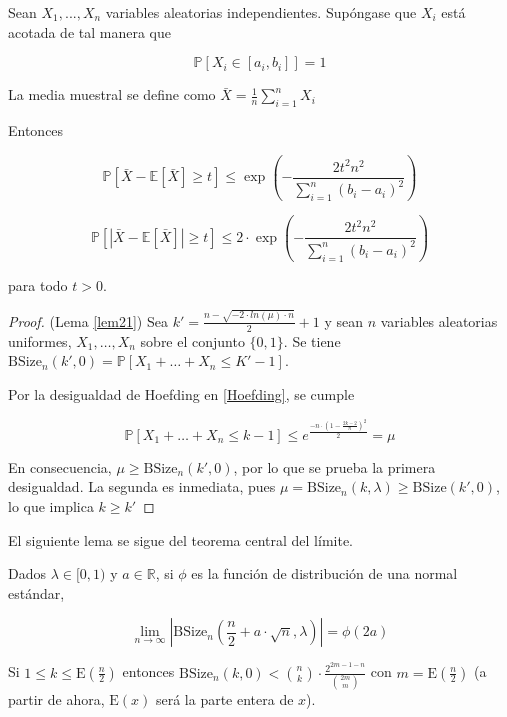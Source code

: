\begin{lema} \label{Hoefding}
Sean $X_1,...,X_n$ variables aleatorias independientes. Supóngase que $X_i$ está acotada de tal manera que 

$$\mathbb{P}[X_i \in [a_i,b_i]] = 1$$

La media muestral se define como $\bar{X} = \frac{1}{n} \sum_{i=1}^n X_i$

Entonces

\begin{equation}
\mathbb{P}[\bar{X} - \mathbb{E}[\bar{X}] \geq t] \leq \exp \left( - \frac{2t^2n^2}{\sum_{i=1}^n (b_i-a_i)^2} \right)
\end{equation}

\begin{equation}
\mathbb{P}[|\bar{X}-\mathbb{E}[\bar{X}]| \geq t] \leq 2 \cdot \exp \left( - \frac{2t^2n^2}{\sum_{i=1}^n (b_i - a_i)^2} \right)
\end{equation}

para todo $t > 0$.

\end{lema}

\begin{proof}(Lema \ref{lem21})
Sea $k' = \frac{n-\sqrt{-2 \cdot ln(\mu)\cdot n}}{2}+1$ y sean $n$ variables aleatorias uniformes, $X_1,\ldots,X_n$ sobre el conjunto $\{0,1\}$. Se tiene $\text{BSize}_n(k',0)=\mathbb{P}[X_1+\ldots+X_n \leq K'-1]$.

Por la desigualdad de Hoefding en \ref{Hoefding}, se cumple

$$\mathbb{P}[X_1+\ldots+X_n\leq k-1] \leq e^{\frac{-n\cdot(1-\frac{2k-2}{n})^2}{2}}=\mu$$

En consecuencia, $\mu \geq \text{BSize}_n(k',0)$, por lo que se prueba la primera desigualdad. La segunda es inmediata, pues $\mu=\text{BSize}_n(k,\lambda)\geq\text{BSize}(k',0)$, lo que implica $k\geq k'$
\end{proof}

El siguiente lema se sigue del teorema central del límite.

\begin{lema} \label{lemTCL}
 Dados $\lambda \in [0,1)$ y $a \in \mathbb{R}$, si $\phi$ es la función de distribución de una normal estándar,
 
 $$\lim_{n \to \infty} \left|\text{BSize}_n\left(\frac{n}{2}+a\cdot\sqrt{n},\lambda\right)\right| = \phi(2a)
$$
\end{lema}

\begin{lema} \label{lem24}
Si $1\leq k \leq \text{E}(\frac{n}{2})$ entonces $\text{BSize}_n(k,0) < \binom{n}{k}\cdot \frac{2^{2m-1-n}}{\binom{2m}{m}}$ con $m=\text{E}(\frac{n}{2})$ (a partir de ahora, $\text{E}(x)$ será la parte entera de $x$).
\end{lema}


